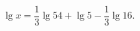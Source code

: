 \begin{ex}[type=equation]
	\begin{condition}
		$\lg x = \dfrac{1}{3}\lg 54 + \lg 5 - \dfrac{1}{3}\lg 16.$
	\end{condition}
\end{ex}